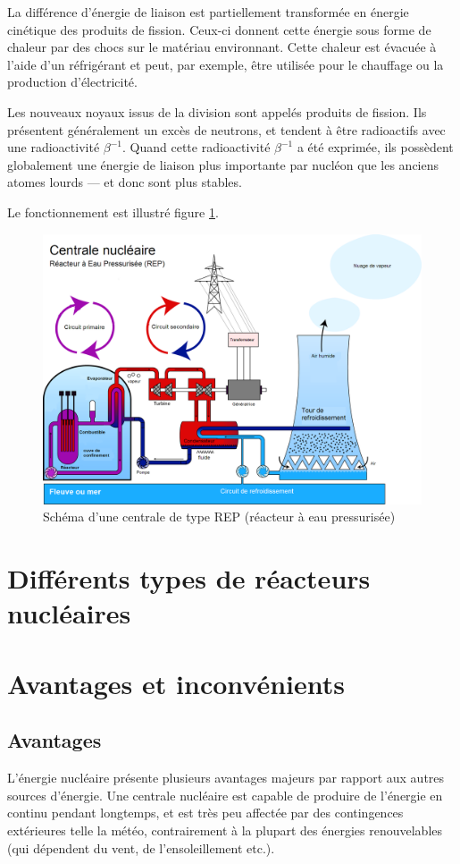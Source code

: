 \documentclass[12pt,a4paper,oneside,openany]{memoir}
\begin{document}
La différence d'énergie de liaison est partiellement transformée en énergie cinétique des produits de fission. Ceux-ci donnent cette énergie sous forme de chaleur par des chocs sur le matériau environnant. Cette chaleur est évacuée à l'aide d'un réfrigérant et peut, par exemple, être utilisée pour le chauffage ou la production d'électricité. 

Les nouveaux noyaux issus de la division sont appelés produits de fission. Ils présentent généralement un excès de neutrons, et tendent à être radioactifs avec une radioactivité $\beta^{-1}$. Quand cette radioactivité $\beta^{-1}$ a été exprimée, ils possèdent globalement une énergie de liaison plus importante par nucléon que les anciens atomes lourds — et donc sont plus stables.

Le fonctionnement est illustré figure \ref{centrale}.

\begin{figure}[h]
	\centering
	\includegraphics[width=\textwidth]{img/centrale.png}
	\caption{Schéma d'une centrale de type REP (réacteur à eau pressurisée)}
	\label{centrale}
\end{figure}

\section{Différents types de réacteurs nucléaires}
\section{Avantages et inconvénients}

\subsection{Avantages}
L'énergie nucléaire présente plusieurs avantages majeurs par rapport aux autres sources d'énergie. Une centrale nucléaire est capable de produire de l'énergie en continu pendant longtemps, et est très peu affectée par des contingences extérieures telle la météo, contrairement à la plupart des énergies renouvelables (qui dépendent du vent, de l'ensoleillement etc.).
\end{document}
